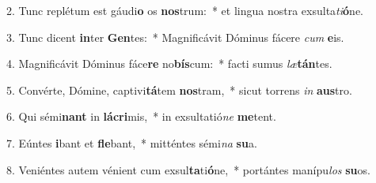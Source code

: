 2. Tunc replétum est gáudi\textbf{o} os \textbf{nos}trum:~*  et lingua nostra exsulta\textit{ti}\textbf{ó}ne.\

3. Tunc dicent \textbf{in}ter \textbf{Gen}tes:~*  Magnificávit Dóminus fácere \textit{cum} \textbf{e}is.\

4. Magnificávit Dóminus fáce\textbf{re} no\textbf{bís}cum:~*  facti sumus \textit{læ}\textbf{tán}tes.\

5. Convérte, Dómine, captivi\textbf{tá}tem \textbf{nos}tram,~*  sicut torrens \textit{in} \textbf{aus}tro.\

6. Qui sémi\textbf{nant} in \textbf{lá}\textbf{cri}mis,~*  in exsultatió\textit{ne} \textbf{me}tent.\

7. Eúntes \textbf{i}bant et \textbf{fle}bant,~*  mitténtes sémi\textit{na} \textbf{su}a.\

8. Veniéntes autem vénient cum exsul\textbf{ta}ti\textbf{ó}ne,~*  portántes manípu\textit{los} \textbf{su}os.\

